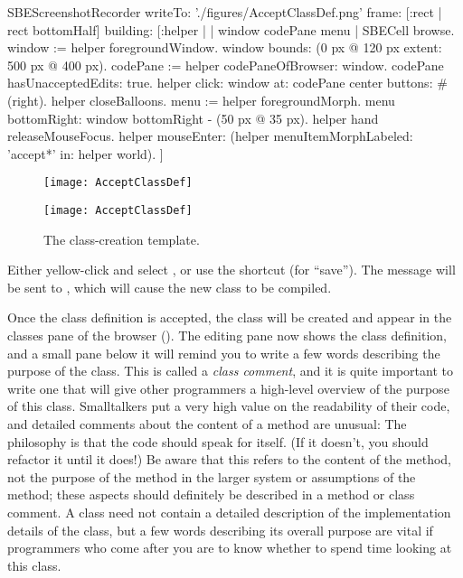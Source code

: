 \documentclass[a4paper,10pt,twoside]{book}
\begin{document}
\begin{ExecuteSmalltalkScript}
SBEScreenshotRecorder writeTo: './figures/AcceptClassDef.png' frame: [:rect | rect bottomHalf] building: [:helper |
	| window codePane menu |
	SBECell browse.
	window := helper foregroundWindow.
	window bounds: (0 px @ 120 px extent: 500 px @ 400 px).
	codePane := helper codePaneOfBrowser: window.
	codePane hasUnacceptedEdits: true.
	helper click: window at: codePane center buttons: #(right).
	helper closeBalloons.
	menu := helper foregroundMorph.
	menu bottomRight: window bottomRight - (50 px @ 35 px).
	helper hand releaseMouseFocus.
	helper mouseEnter: (helper menuItemMorphLabeled: 'accept*' in: helper world).
]
\end{ExecuteSmalltalkScript}
\begin{figure}[h!t]
\ifluluelse
	{\centerline {\texttt{[image: AcceptClassDef]}}}
	{\centerline {\texttt{[image: AcceptClassDef]}}}
\caption{The class-creation template.
\label{fig:acceptClassDef}}
\end{figure}

Either yellow-click and select , or use the shortcut  (for ``save'').
The message will be sent to , which will cause the new class to be compiled.

Once the class definition is accepted, the class will be created and appear in the classes pane of the browser ().
The editing pane now shows the class definition, and a small pane below it will remind you to write a few words describing the purpose of the class.
This is called a \emph{class comment}, and it is quite important to write one that will give other programmers a high-level overview of the purpose of this class.
Smalltalkers put a very high value on the readability of their code, and detailed comments about the content of a method are unusual:
The philosophy is that the code should speak for itself.
(If it doesn't, you should refactor it until it does!)
Be aware that this refers to the content of the method, not the purpose of the method in the larger system or assumptions of the method; these aspects should definitely be described in a method or class comment.
A class  need not contain a detailed description of the implementation details of the class, but a few words describing its overall purpose are vital if programmers who come after you are to know whether to spend time looking at this class.
\end{document}
